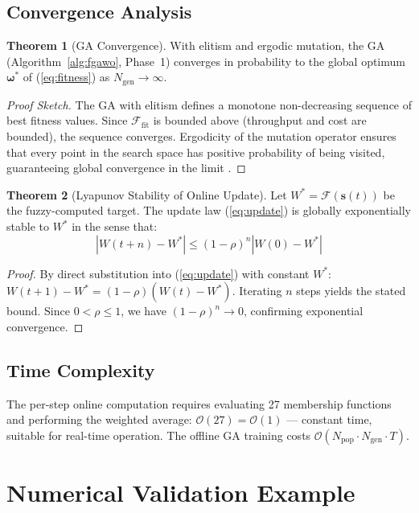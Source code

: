\documentclass[10pt, twocolumn]{IEEEtran}
\theoremstyle{definition}
\newtheorem{theorem}{Theorem}
\begin{document}
\subsection{Convergence Analysis}

\begin{theorem}[GA Convergence]
With elitism and ergodic mutation, the GA (Algorithm~\ref{alg:fgawo}, Phase~1) converges in probability to the global optimum $\boldsymbol{\omega}^*$ of (\ref{eq:fitness}) as $N_{\text{gen}} \to \infty$.
\end{theorem}
\begin{proof}[Proof Sketch]
The GA with elitism defines a monotone non-decreasing sequence of best fitness values. Since $\mathcal{F}_{\text{fit}}$ is bounded above (throughput and cost are bounded), the sequence converges. Ergodicity of the mutation operator ensures that every point in the search space has positive probability of being visited, guaranteeing global convergence in the limit \cite{goldberg1989genetic}.
\end{proof}

\begin{theorem}[Lyapunov Stability of Online Update]
Let $W^* = \mathcal{F}(\mathbf{s}(t))$ be the fuzzy-computed target. The update law (\ref{eq:update}) is globally exponentially stable to $W^*$ in the sense that:
\begin{equation}
  |W(t+n) - W^*| \leq (1-\rho)^n |W(0) - W^*|
\end{equation}
\end{theorem}
\begin{proof}
By direct substitution into (\ref{eq:update}) with constant $W^*$:
$W(t+1) - W^* = (1-\rho)(W(t) - W^*)$. Iterating $n$ steps yields the stated bound. Since $0 < \rho \leq 1$, we have $(1-\rho)^n \to 0$, confirming exponential convergence.
\end{proof}

\subsection{Time Complexity}

The per-step online computation requires evaluating 27 membership functions and performing the weighted average: $\mathcal{O}(27) = \mathcal{O}(1)$ — constant time, suitable for real-time operation. The offline GA training costs $\mathcal{O}(N_{\text{pop}} \cdot N_{\text{gen}} \cdot T)$.

\section{Numerical Validation Example}
\label{sec:example}
\end{document}

